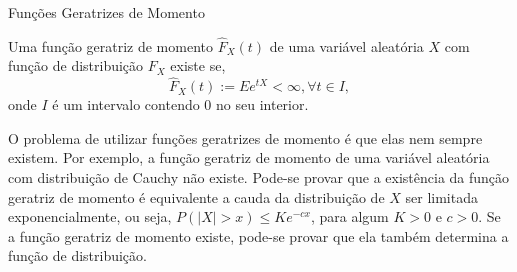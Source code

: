 %
%
%
%
%
%
%
%
%
%
%

\begin{frame}{Funções Geratrizes de Momento}


\begin{defi}
Uma função geratriz de momento $\hat{F}_X(t)$ de uma variável
aleatória $X$ com função de distribuição $F_X$ existe se,
$$\hat{F}_X(t):=Ee^{tX}<\infty,\forall t\in I,$$
onde $I$ é um intervalo contendo 0 no seu interior.
\end{defi}

O problema de utilizar funções geratrizes de momento é que elas nem
sempre existem. Por exemplo, a função geratriz de momento de uma
variável aleatória com distribuição de Cauchy não existe. Pode-se
provar que a existência da função geratriz de momento é equivalente
a cauda da distribuição de $X$ ser limitada exponencialmente, ou
seja, $P(|X|>x)\leq Ke^{-cx}$, para algum $K>0$ e $c>0$. Se a função
geratriz de momento existe, pode-se provar que ela também determina
a função de distribuição.

\end{frame}


